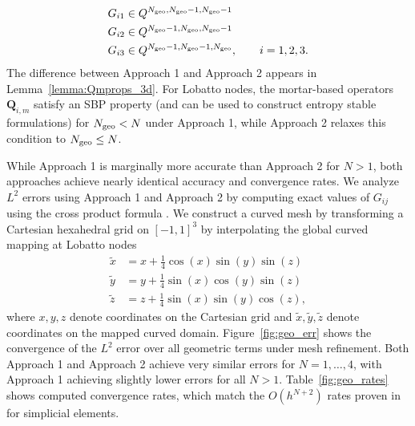 \documentclass{svjour3}                     %
\renewcommand{\tilde}{\widetilde}
\begin{document}
\begin{align*}
&G_{i1} \in Q^{N_{\rm geo},N_{\rm geo}-1,N_{\rm geo}-1}\\
&G_{i2} \in Q^{N_{\rm geo}-1,N_{\rm geo},N_{\rm geo}-1}\\
&G_{i3} \in Q^{N_{\rm geo}-1,N_{\rm geo}-1,N_{\rm geo}}, \qquad i = 1,2,3.
\end{align*} 
The difference between Approach 1 and Approach 2 appears in Lemma~\ref{lemma:Qmprops_3d}.  For Lobatto nodes, the mortar-based operators $\bm{Q}_{i,m}$ satisfy an SBP property (and can be used to construct entropy stable formulations) for $N_{\rm geo} < N$ under Approach 1, while Approach 2 relaxes this condition to $N_{\rm geo} \leq N$.  

While Approach 1 is marginally more accurate than Approach 2 for $N > 1$, both approaches achieve nearly identical accuracy and convergence rates.  We analyze $L^2$ errors using Approach 1 and Approach 2 by  computing exact values of $G_{ij}$ using the cross product formula \cite{kopriva2006metric, hesthaven2007nodal}.   We construct a curved mesh by transforming a Cartesian hexahedral grid on $[-1,1]^3$ by interpolating the global curved mapping at Lobatto nodes
\begin{align*}
    \tilde{x} &= x + \frac{1}{4}\cos(x)\sin(y)\sin(z)\\
    \tilde{y} &= y + \frac{1}{4}\sin(x)\cos(y)\sin(z)\\
    \tilde{z} &= z + \frac{1}{4}\sin(x)\sin(y)\cos(z),
\end{align*}
where $x,y,z$ denote coordinates on the Cartesian grid and $\tilde{x},\tilde{y},\tilde{z}$ denote coordinates on the mapped curved domain.  Figure~\ref{fig:geo_err} shows the convergence of the $L^2$ error over all geometric terms under mesh refinement.  Both Approach 1 and Approach 2 achieve very similar errors for $N=1,\ldots, 4$, with Approach 1 achieving slightly lower errors for all $N > 1$.  Table~\ref{fig:geo_rates} shows computed convergence rates, which match the $O(h^{N+2})$ rates proven in \cite{chan2018discretely, crean2018entropy} for simplicial elements.
\end{document}
